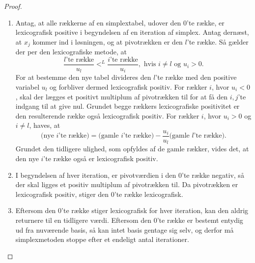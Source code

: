 \begin{proof}
\begin{enumerate}[label=(\alph*)]
\item Antag, at alle rækkerne af en simplextabel, udover den $0$'te række, er lexicografisk positive i begyndelsen af en iteration af simplex. 
Antag dernæst, at $x_j$ kommer ind i løsningen, og at pivotrækken er den $l$'te række. Så gælder der per den lexicografiske metode, at
$$\dfrac{l\text{'te række}}{u_l}<^L \dfrac{i\text{'te række}}{u_i}, \text{  hvis } i\neq l \text{ og }u_i>0.$$
For at bestemme den nye tabel divideres den $l$'te række med den positive variabel $u_l$ og forbliver dermed lexicografisk positiv.
For rækker $i$, hvor $u_i<0$, skal der lægges et positivt multiplum af pivotrækken til for at få den $i,j$'te indgang til at give nul. 
Grundet begge rækkers lexicografiske positivitet er den resulterende række også lexicografisk positiv. 
For rækker $i$, hvor $u_i>0$ og $i\neq l$, haves, at
$$\text{(nye }i\text{'te række)}=\text{(gamle }i\text{'te række)}-\dfrac{u_i}{u_l}\text{(gamle }l\text{'te række)}.$$
Grundet den tidligere ulighed, som opfyldes af de gamle rækker, vides det, at den nye $i$'te række også er lexicografisk positiv.
% 
\item I begyndelsen af hver iteration, er pivotværdien i den $0$'te række negativ, så der skal ligges et positiv multiplum af pivotrækken til. 
Da pivotrækken er lexicografisk positiv, stiger den $0$'te række lexicografisk.
% 
\item Eftersom den $0$'te række stiger lexicografisk for hver iteration, kan den aldrig returnere til en tidligere værdi.
Eftersom den $0$'te række er bestemt entydig ud fra nuværende basis, så kan intet basis gentage sig selv, og derfor må simplexmetoden stoppe efter et endeligt antal iterationer.
\end{enumerate}
\end{proof}
%
%
%
%
%